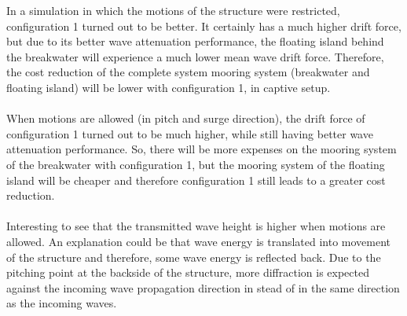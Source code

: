 In a simulation in which the motions of the structure were restricted, configuration 1 turned out to be better. It certainly has a much higher drift force, but due to its better wave attenuation performance, the floating island behind the breakwater will experience a much lower mean wave drift force. Therefore, the cost reduction of the complete system mooring system (breakwater and floating island) will be lower with configuration 1, in captive setup. \\
\\
When motions are allowed (in pitch and surge direction), the drift force of configuration 1 turned out to be much higher, while still having better wave attenuation performance. So, there will be more expenses on the mooring system of the breakwater with configuration 1, but the mooring system of the floating island will be cheaper and therefore configuration 1 still leads to a greater cost reduction.\\
\\
Interesting to see that the transmitted wave height is higher when motions are allowed. An explanation could be that wave energy is translated into movement of the structure and therefore, some wave energy is reflected back. Due to the pitching point at the backside of the structure, more diffraction is expected against the incoming wave propagation direction in stead of in the same direction as the incoming waves. 